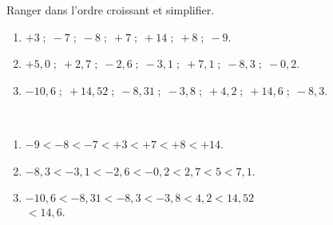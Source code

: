 \begin{exercice}
    Ranger dans l'ordre croissant et simplifier.
    {\baselineskip=7mm
    \begin{enumerate}
       \item $+3 \; ; \; -7 \;;\;-8 \;;\; +7 \;; \;+14\; ;\; +8 \;;\; -9$.
       \item $+5,0\; ; \;+2,7 \;;\; -2,6\; ; \;-3,1\; ; \;+7,1\; ; \;-8,3\; ;\; -0,2$.
       \item $-10,6 \;; \;+14,52\; ;\; -8,31 \;; \;-3,8 \;; \;+4,2 \;; \;+14,6\; ;\; -8,3$.
    \end{enumerate}}  
 \end{exercice}
 
 \begin{corrige}
    \ \\ [-7mm]
    {\baselineskip=7mm
    \begin{enumerate}
       \item \red $-9<-8<-7<+3<+7<+8<+14$.
       \item \red $-8,3<-3,1<-2,6<-0,2<2,7<5<7,1$.
       \item \red$-10,6<-8,31<-8,3<-3,8<4,2<14,52$ \\
       \hfill $<14,6$.
    \end{enumerate}}  
 \end{corrige}